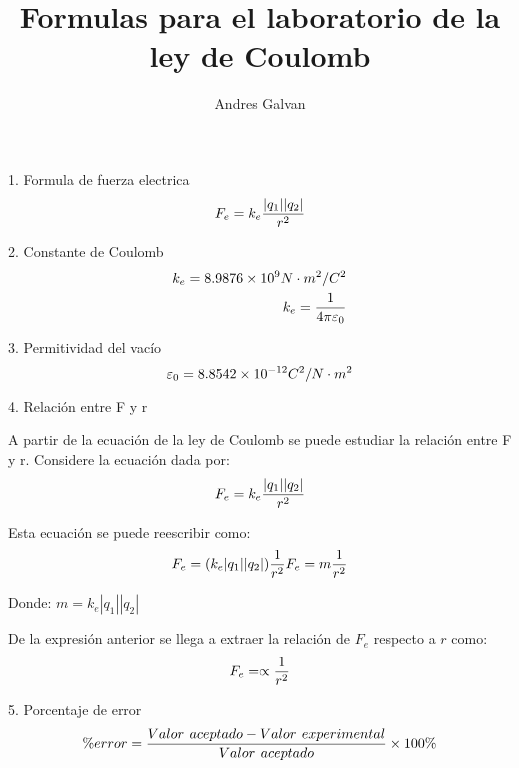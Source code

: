 \documentclass{article}
\title{Formulas para el laboratorio de la ley de Coulomb}
\author{Andres Galvan}
\begin{document}
\maketitle

1. Formula de fuerza electrica
\begin{equation}
    \large F_{e} = k_{e}\frac{|q_{1}||q_{2}|}{r^{2}}
\end{equation}

2. Constante de Coulomb
\begin{equation}
\begin{split}
    \large k_{e} = 8.9876 \times 10^{9}N \cdot m^{2}/C^{2} \\
    \large k_{e} = \frac{1}{4\pi \varepsilon_{0} }
\end{split}
\end{equation}

3. Permitividad del vacío
\begin{equation}
    \large \varepsilon_{0} = 8.8542 \times 10^{-12}C^2/N\cdot m^2
\end{equation}

4. Relación entre F y r

A partir de la ecuación de la ley de Coulomb se puede estudiar la relación entre F 
y r. Considere la ecuación dada por:
\begin{equation}
    \large F_{e} = k_{e}\frac{|q_{1}||q_{2}|}{r^{2}}
\end{equation}

Esta ecuación se puede reescribir como: 
\begin{equation}
    \large F_{e} = (k_{e}|q_{1}||q_{2}|)\frac{1}{r^{2}}
    \large F_{e} = m\frac{1}{r^{2}}
\end{equation}

Donde: $m = k_{e}|q_{1}||q_{2}|$

De la expresión anterior se llega a extraer la relación de $F_{e}$ respecto a  $r$ como: 
\begin{equation}
    \large F_{e} = \propto \frac{1}{r^{2}}
\end{equation}

5. Porcentaje de error
\begin{equation}
    \large \% error = \frac{Valor\ aceptado - Valor\ experimental}{Valor\ aceptado} \times 100\%
\end{equation}
\end{document}

